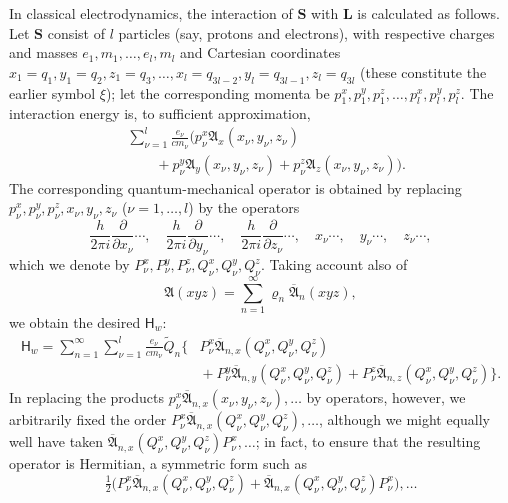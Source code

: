 \documentclass[fontsize=13pt,twoside,openany,headings=normal,parskip=false,bookmarkpackage=false,DIV=calc]{scrbook}
\begin{document}
In classical electrodynamics, the interaction of $\boldsymbol{S}$ with $\boldsymbol{L}$ is calculated as follows. Let $\boldsymbol{S}$ consist of $l$ particles (say, protons and electrons), with respective charges and masses $e_1,m_1,\ldots,e_l,m_l$ and Cartesian coordinates $x_1=q_1,y_1=q_2,z_1=q_3,\ldots,x_l=q_{3l-2},y_l=q_{3l-1},z_l=q_{3l}$ (these constitute the earlier symbol $\xi$); let the corresponding momenta be $p_1^x,p_1^y,p_1^z,\ldots,p_l^x,p_l^y,p_l^z$. The interaction energy is, to sufficient approximation,
\begin{align*}
 &\sum_{\nu=1}^{l}\frac{e_\nu}{cm_\nu}
 \bigl(p_\nu^x\mathfrak A_x(x_\nu,y_\nu,z_\nu)\\
 &\qquad{}+p_\nu^y\mathfrak A_y(x_\nu,y_\nu,z_\nu)
 +p_\nu^z\mathfrak A_z(x_\nu,y_\nu,z_\nu)\bigr).
\end{align*}
The corresponding quantum-mechanical operator is obtained by replacing $p_\nu^x,p_\nu^y,p_\nu^z,x_\nu,y_\nu,z_\nu$ ($\nu=1,\ldots,l$) by the operators
\[
 \frac{h}{2\pi i}\frac{\partial}{\partial x_\nu}\cdots,\quad
 \frac{h}{2\pi i}\frac{\partial}{\partial y_\nu}\cdots,\quad
 \frac{h}{2\pi i}\frac{\partial}{\partial z_\nu}\cdots,\quad
 x_\nu\cdots,\quad y_\nu\cdots,\quad z_\nu\cdots,
\]
which we denote by $P_\nu^x,P_\nu^y,P_\nu^z,Q_\nu^x,Q_\nu^y,Q_\nu^z$. Taking account also of
\[
 \mathfrak A(xyz)=\sum_{n=1}^{\infty}\varrho_n\overline{\mathfrak A}_n(xyz),
\]
we obtain the desired $\mathsf{H}_w$:
\begin{align*}
 \mathsf{H}_w=\sum_{n=1}^{\infty}\sum_{\nu=1}^{l}\frac{e_\nu}{cm_\nu}\widetilde Q_n
 \bigl\{&P_\nu^x\overline{\mathfrak A}_{n,x}(Q_\nu^x,Q_\nu^y,Q_\nu^z)\\
 &{}+P_\nu^y\overline{\mathfrak A}_{n,y}(Q_\nu^x,Q_\nu^y,Q_\nu^z)
 +P_\nu^z\overline{\mathfrak A}_{n,z}(Q_\nu^x,Q_\nu^y,Q_\nu^z)\bigr\}.
\end{align*}
In replacing the products $p_\nu^x\overline{\mathfrak A}_{n,x}(x_\nu,y_\nu,z_\nu),\allowbreak\ldots$ by operators, however, we arbitrarily fixed the order $P_\nu^x\overline{\mathfrak A}_{n,x}(Q_\nu^x,Q_\nu^y,Q_\nu^z),\allowbreak\ldots$, although we might equally well have taken $\overline{\mathfrak A}_{n,x}(Q_\nu^x,Q_\nu^y,Q_\nu^z)P_\nu^x,\allowbreak\ldots$; in fact, to ensure that the resulting operator is Hermitian, a symmetric form such as
\[
 \tfrac12\bigl(P_\nu^x\overline{\mathfrak A}_{n,x}(Q_\nu^x,Q_\nu^y,Q_\nu^z)
 +\overline{\mathfrak A}_{n,x}(Q_\nu^x,Q_\nu^y,Q_\nu^z)P_\nu^x\bigr),\ldots
\]
\end{document}
